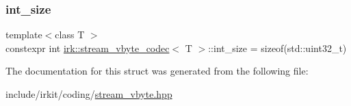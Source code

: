 \subsubsection{\texorpdfstring{int\+\_\+size}{int\_size}}
{\footnotesize\ttfamily template$<$class T $>$ \\
constexpr int \mbox{\hyperlink{structirk_1_1stream__vbyte__codec}{irk\+::stream\+\_\+vbyte\+\_\+codec}}$<$ T $>$\+::int\+\_\+size = sizeof(std\+::uint32\+\_\+t)\hspace{0.3cm}{\ttfamily [static]}}



The documentation for this struct was generated from the following file\+:\begin{DoxyCompactItemize}
\item 
include/irkit/coding/\mbox{\hyperlink{stream__vbyte_8hpp}{stream\+\_\+vbyte.\+hpp}}\end{DoxyCompactItemize}
